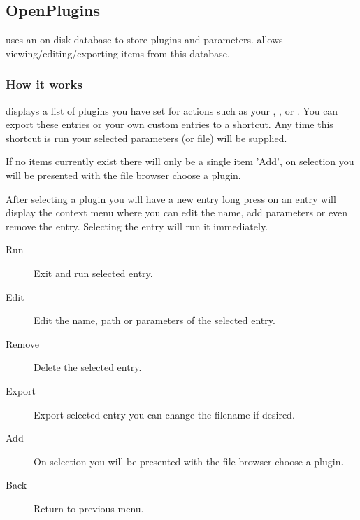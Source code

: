 \subsection{OpenPlugins}
 uses an on disk database to store plugins and parameters.
 allows viewing/editing/exporting items from this database.

\subsubsection{How it works}
 displays a list of plugins you have set for actions such
as your , , or .
You can export these entries or your own custom entries to a shortcut.
Any time this shortcut is run your selected parameters (or file) will be supplied.

If no items currently exist there will only be a single item 'Add',
on selection you will be presented with the file browser choose a plugin.

After selecting a plugin you will have a new entry long press on an entry will 
display the context menu where you can edit the name,
add parameters or even remove the entry.
Selecting the entry will run it immediately.

\begin{description}
\item[Run] Exit and run selected entry.
\item[Edit] Edit the name, path or parameters of the selected entry.
\item[Remove] Delete the selected entry.
\item[Export] Export selected entry you can change the filename if desired.
\item[Add] On selection you will be presented with the file browser choose a plugin.
\item[Back] Return to previous menu.
\end{description}
